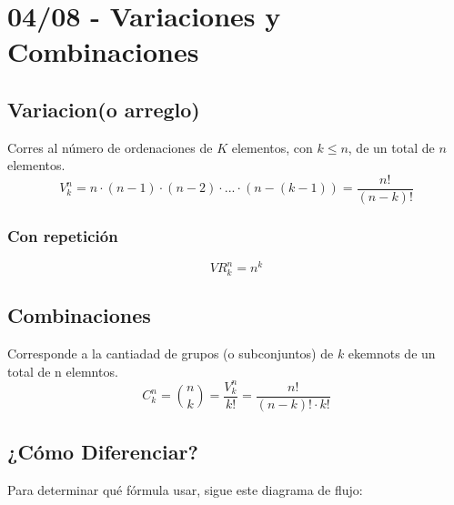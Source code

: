 \documentclass[12pt, letterpaper]{article}
\begin{document}
\newpage

\section{04/08 - Variaciones y Combinaciones}
    \subsection{Variacion(o arreglo)}
        Corres al número de ordenaciones de $K$ elementos, con $k \leq n$, de un total de $n$ elementos.
        \[V_k^n = n \cdot (n - 1) \cdot (n - 2) \cdot ... \cdot (n - (k - 1)) = \frac{n!}{(n - k)!} \]
        \subsubsection*{Con repetición}
            \[VR_k^n = n^k \]
    \subsection{Combinaciones} Corresponde a la cantiadad de grupos (o subconjuntos) de $k$ ekemnots de un total de n elemntos. 
    \[C_k^n = \binom{n}{k} = \frac{V_k^n}{k!} = \frac{n!}{(n - k)! \cdot k!} \]

    \subsection*{¿Cómo Diferenciar?}
Para determinar qué fórmula usar, sigue este diagrama de flujo:
\end{document}
